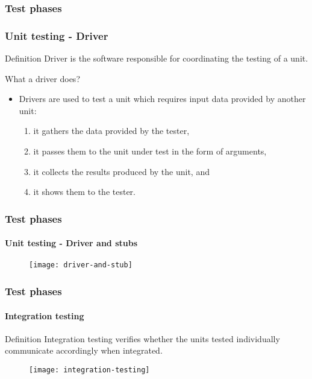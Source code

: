 \begin{frame}
\label{concept:driver}
\label{concept:test-driver}
\frametitle{Test phases}
\frametitle{Unit testing - Driver}

\begin{block:concept}{Definition}
Driver is the software responsible for coordinating the testing of a unit.
\end{block:concept}

\begin{block:fact}{What a driver does?}
\begin{itemize}
	\item Drivers are used to test a unit which requires input data provided
	by another unit:
	\begin{enumerate}
		\item it gathers the data provided by the tester,
		\item it passes them to the unit under test in the form of arguments,
		\item it collects the results produced by the unit, and
		\item it shows them to the tester.
	\end{enumerate}
\end{itemize}
\end{block:fact}
\end{frame}


\begin{frame}[c]
\frametitle{Test phases}
\framesubtitle{Unit testing - Driver and stubs}

\begin{figure}
	\centering
	\texttt{[image: driver-and-stub]}
\end{figure}
\end{frame}



\begin{frame}
\label{concept:integration-testing}
\frametitle{Test phases}
\framesubtitle{Integration testing}

\begin{block:concept}{Definition}
Integration testing verifies whether the units tested individually communicate
accordingly when integrated.
\end{block:concept}

\begin{figure}
    \centering
    \texttt{[image: integration-testing]}
\end{figure}

\hfill
{}
\end{frame}



